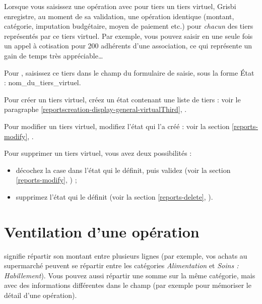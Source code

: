 Lorsque vous saisissez une opération avec pour tiers un tiers virtuel, Grisbi enregistre, au moment de sa validation, une opération identique (montant, catégorie, imputation budgétaire, moyen de paiement etc.) pour \emph{chacun} des tiers représentés par ce tiers virtuel. Par exemple, vous pouvez saisir en une seule fois un appel à cotisation pour 200 adhérents d'une association, ce qui représente un gain de temps très appréciable\ldots

Pour , saisissez ce tiers  dans le champ  du formulaire de saisie, sous la forme \og État : nom\_du\_tiers\_virtuel\fg{}. 

Pour créer un tiers virtuel, créez un état contenant une liste de tiers : voir le paragraphe \vref{reportscreation-display-general-virtualThird}, .

Pour modifier un tiers virtuel, modifiez l'état qui l'a créé : voir la section \vref{reports-modify}, .

Pour supprimer un tiers virtuel, vous avez deux possibilités :

\begin{itemize}
	\item décochez la case  dans l'état qui le définit, puis validez (voir la section \vref{reports-modify}, ) ;
	\item supprimez l'état qui le définit (voir la section \vref{reports-delete}, ).
\end{itemize}

\ifIllustration
\newpage
\fi


\section{Ventilation d'une opération\label{transactions-breakdown}}


 signifie répartir son montant entre plusieurs lignes (par exemple, vos achats au supermarché peuvent se répartir entre les catégories \emph{Alimentation} et \emph{Soins : Habillement}). Vous pouvez aussi répartir une somme sur la même catégorie, mais avec des informations différentes dans le champ  (par exemple pour mémoriser le détail d'une opération).


